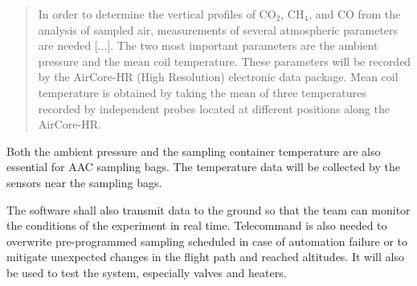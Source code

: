 \documentclass[a4paper,12pt,twoside]{article}
\begin{document}
\begin{quote}
In order to determine the vertical profiles of CO$_2$, CH$_4$, and CO from the analysis of sampled air, measurements of several atmospheric parameters are needed [...]. The two most important parameters are the ambient pressure and the mean coil temperature. These parameters will be recorded by the AirCore-HR (High Resolution) electronic data package. Mean coil temperature is obtained by taking the mean of three temperatures recorded by independent probes located at different positions along the AirCore-HR.\cite{Membrive}
\end{quote}

Both the ambient pressure and the sampling container temperature are also essential for AAC sampling bags. The temperature data will be collected by the sensors near the sampling bags.

The software shall also transmit data to the ground so that the team can monitor the conditions of the experiment in real time. Telecommand is also needed to overwrite pre-programmed sampling scheduled in case of automation failure or to mitigate unexpected changes in the flight path and reached altitudes. It will also be used to test the system, especially valves and heaters.\par
\end{document}
